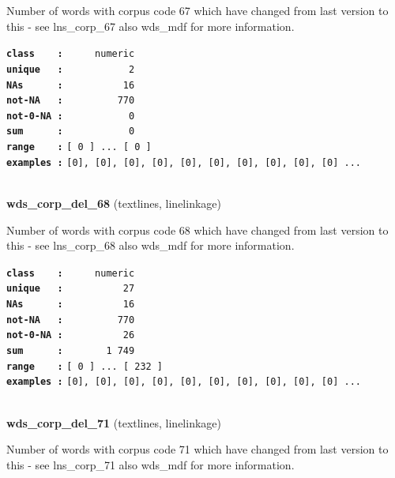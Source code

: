 \documentclass[]{article}
\begin{document}
Number of words with corpus code 67 which have changed from last version
to this - see lns\_corp\_67 also wds\_mdf for more information.

\textbf{\texttt{class\ \ \ \ :}} \texttt{~~~~~numeric}\\
\textbf{\texttt{unique\ \ \ :}} \texttt{~~~~~~~~~~~2}\\
\textbf{\texttt{NAs\ \ \ \ \ \ :}} \texttt{~~~~~~~~~~16}\\
\textbf{\texttt{not-NA\ \ \ :}} \texttt{~~~~~~~~~770}\\
\textbf{\texttt{not-0-NA\ :}} \texttt{~~~~~~~~~~~0}\\
\textbf{\texttt{sum\ \ \ \ \ \ :}} \texttt{~~~~~~~~~~~0}\\
\textbf{\texttt{range\ \ \ \ :}}
\texttt{{[}\ 0\ {]}\ ...\ {[}\ 0\ {]}}\\
\textbf{\texttt{examples\ :}}
\texttt{{[}0{]},\ {[}0{]},\ {[}0{]},\ {[}0{]},\ {[}0{]},\ {[}0{]},\ {[}0{]},\ {[}0{]},\ {[}0{]},\ {[}0{]}\ ...}\\

~

\textbf{wds\_corp\_del\_68} (textlines, linelinkage)

Number of words with corpus code 68 which have changed from last version
to this - see lns\_corp\_68 also wds\_mdf for more information.

\textbf{\texttt{class\ \ \ \ :}} \texttt{~~~~~numeric}\\
\textbf{\texttt{unique\ \ \ :}} \texttt{~~~~~~~~~~27}\\
\textbf{\texttt{NAs\ \ \ \ \ \ :}} \texttt{~~~~~~~~~~16}\\
\textbf{\texttt{not-NA\ \ \ :}} \texttt{~~~~~~~~~770}\\
\textbf{\texttt{not-0-NA\ :}} \texttt{~~~~~~~~~~26}\\
\textbf{\texttt{sum\ \ \ \ \ \ :}} \texttt{~~~~~~~1~749}\\
\textbf{\texttt{range\ \ \ \ :}}
\texttt{{[}\ 0\ {]}\ ...\ {[}\ 232\ {]}}\\
\textbf{\texttt{examples\ :}}
\texttt{{[}0{]},\ {[}0{]},\ {[}0{]},\ {[}0{]},\ {[}0{]},\ {[}0{]},\ {[}0{]},\ {[}0{]},\ {[}0{]},\ {[}0{]}\ ...}\\

~

\textbf{wds\_corp\_del\_71} (textlines, linelinkage)

Number of words with corpus code 71 which have changed from last version
to this - see lns\_corp\_71 also wds\_mdf for more information.
\end{document}

